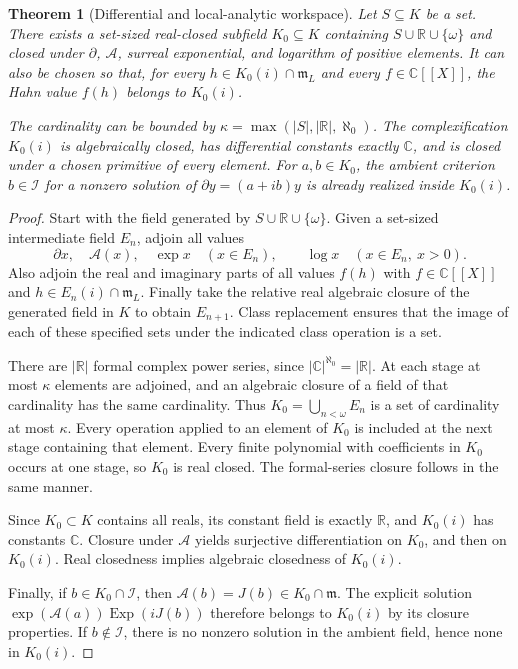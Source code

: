 \documentclass[11pt]{article}
\numberwithin{equation}{section}
\newtheorem{theorem}{Theorem}[section]
\theoremstyle{definition}
\newcommand{\R}{\mathbb R}
\newcommand{\C}{\mathbb C}
\newcommand{\mm}{\mathfrak m}
\newcommand{\II}{\mathcal I}
\newcommand{\DD}{\partial}
\newcommand{\Prim}{\mathcal A}
\newcommand{\Exp}{\operatorname{Exp}}
\begin{document}
\begin{theorem}[Differential and local-analytic workspace]
\label{thm:workspace}
Let $S\subseteq K$ be a set. There exists a set-sized real-closed
subfield $K_0\subseteq K$ containing $S\cup\R\cup\{\omega\}$
and closed under $\DD$, $\Prim$, surreal exponential, and logarithm
of positive elements. It can also be chosen so that, for every
$h\in K_0(i)\cap\mm_L$ and every $f\in\C[[X]]$, the Hahn value
$f(h)$ belongs to $K_0(i)$.

The cardinality can be bounded by
$\kappa=\max(|S|,|\R|,\aleph_0)$. The complexification $K_0(i)$ is
algebraically closed, has differential constants exactly $\C$, and is
closed under a chosen primitive of every element. For $a,b\in K_0$, the
ambient criterion $b\in\II$ for a nonzero solution of
$\DD y=(a+ib)y$ is already realized inside $K_0(i)$.
\end{theorem}
\begin{proof}
Start with the field generated by $S\cup\R\cup\{\omega\}$.
Given a set-sized intermediate field $E_n$, adjoin all values
\[
 \DD x,\quad \Prim(x),\quad \exp x\quad(x\in E_n),
 \qquad \log x\quad(x\in E_n,\ x>0).
\]
Also adjoin the real and imaginary parts of all values $f(h)$ with
$f\in\C[[X]]$ and $h\in E_n(i)\cap\mm_L$. Finally take the
relative real algebraic closure of the generated field in $K$ to obtain
$E_{n+1}$. Class replacement ensures that the image of each of these
specified sets under the indicated class operation is a set.

There are $|\R|$ formal complex power series, since
$|\C|^{\aleph_0}=|\R|$. At each stage at most $\kappa$ elements are
adjoined, and an algebraic closure of a field of that cardinality has the
same cardinality. Thus $K_0=\bigcup_{n<\omega}E_n$ is a set of
cardinality at most $\kappa$. Every operation applied to an element of
$K_0$ is included at the next stage containing that element. Every finite
polynomial with coefficients in $K_0$ occurs at one stage, so $K_0$ is real
closed. The formal-series closure follows in the same manner.

Since $K_0\subset K$ contains all reals, its constant field is exactly
$\R$, and $K_0(i)$ has constants $\C$. Closure under $\Prim$ yields
surjective differentiation on $K_0$, and then on $K_0(i)$. Real closedness
implies algebraic closedness of $K_0(i)$.

Finally, if $b\in K_0\cap\II$, then $\Prim(b)=J(b)\in K_0\cap\mm$.
The explicit solution
$\exp(\Prim(a))\Exp(iJ(b))$ therefore belongs to $K_0(i)$ by its
closure properties. If $b\notin\II$, there is no nonzero solution
in the ambient field, hence none in $K_0(i)$.
\end{proof}
\end{document}

